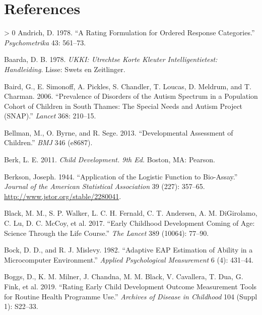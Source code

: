 \documentclass[
]{book}
\newlength{\cslhangindent}
\newenvironment{CSLReferences}[3] %
 {%
  \setlength{\parindent}{0pt}
  \ifodd #1 \everypar{\setlength{\hangindent}{\cslhangindent}}\ignorespaces\fi
  \ifnum #2 > 0
  \setlength{\parskip}{#2\baselineskip}
  \fi
 }%
 {}
\begin{document}
\hypertarget{references}{%
\chapter*{References}\label{references}}

\hypertarget{refs}{}
\begin{CSLReferences}{1}{0}
\leavevmode\hypertarget{ref-andrich1978}{}%
Andrich, D. 1978. {``A Rating Formulation for Ordered Response Categories.''} \emph{Psychometrika} 43: 561--73.

\leavevmode\hypertarget{ref-baarda1978}{}%
Baarda, D. B. 1978. \emph{UKKI: Utrechtse Korte Kleuter Intelligentietest: Handleiding}. Lisse: Swets en Zeitlinger.

\leavevmode\hypertarget{ref-baird2006}{}%
Baird, G., E. Simonoff, A. Pickles, S. Chandler, T. Loucas, D. Meldrum, and T. Charman. 2006. {``Prevalence of Disorders of the Autism Spectrum in a Population Cohort of Children in South Thames: The Special Needs and Autism Project (SNAP).''} \emph{Lancet} 368: 210--15.

\leavevmode\hypertarget{ref-bellman2013}{}%
Bellman, M., O. Byrne, and R. Sege. 2013. {``Developmental Assessment of Children.''} \emph{BMJ} 346 (e8687).

\leavevmode\hypertarget{ref-berk2013}{}%
Berk, L. E. 2011. \emph{Child Development. 9th Ed.} Boston, MA: Pearson.

\leavevmode\hypertarget{ref-berkson1944}{}%
Berkson, Joseph. 1944. {``Application of the Logistic Function to Bio-Assay.''} \emph{Journal of the American Statistical Association} 39 (227): 357--65. \url{http://www.jstor.org/stable/2280041}.

\leavevmode\hypertarget{ref-black2017}{}%
Black, M. M., S. P. Walker, L. C. H. Fernald, C. T. Andersen, A. M. DiGirolamo, C. Lu, D. C. McCoy, et al. 2017. {``Early Childhood Development Coming of Age: Science Through the Life Course.''} \emph{The Lancet} 389 (10064): 77--90.

\leavevmode\hypertarget{ref-bock1982}{}%
Bock, D. D., and R. J. Mislevy. 1982. {``Adaptive {EAP} Estimation of Ability in a Microcomputer Environment.''} \emph{Applied Psychological Measurement} 6 (4): 431--44.

\leavevmode\hypertarget{ref-boggs2019}{}%
Boggs, D., K. M. Milner, J. Chandna, M. M. Black, V. Cavallera, T. Dua, G. Fink, et al. 2019. {``Rating Early Child Development Outcome Measurement Tools for Routine Health Programme Use.''} \emph{Archives of Disease in Childhood} 104 (Suppl 1): S22--33.


\end{CSLReferences}
\end{document}
